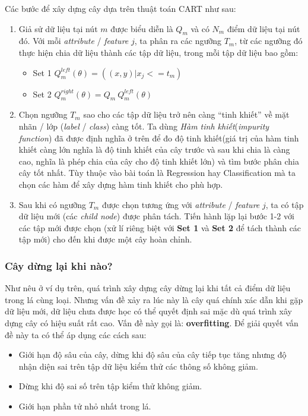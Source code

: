 \documentclass[../main-report.tex]{subfiles}
\begin{document}
Các bước để xây dựng cây dựa trên thuật toán CART như sau:

\begin{enumerate}
\item Giả sử dữ liệu tại nút $m$ được biểu diễn là $Q_{m}$ và có $N_{m}$ điểm dữ liệu tại nút đó. Với mỗi \emph{attribute} / \emph{feature} $j$, ta phân ra các ngưỡng $T_m$, từ các ngưỡng đó thực hiện chia dữ liệu thành các tập dữ liệu, trong mỗi tập dữ liệu bao gồm:

\begin{itemize}
\item Set 1 $Q^{left}_{m}(\theta) = ((x, y)|x_{j} <= t_{m})$
\item Set 2 $Q^{right}_{m}(\theta) = Q_{m} \ Q_{m}^{left}(\theta)$
\end{itemize}

\item Chọn ngưỡng $T_m$ sao cho các tập dữ liệu trở nên càng ``tinh khiết'' về mặt nhãn / lớp (\emph{label} / \emph{class}) càng tốt. Ta dùng \textit{Hàm tinh khiết}(\textit{impurity function}) đã được định nghĩa ở trên để đo độ tinh khiết(giá trị của hàm tinh khiết càng lớn nghĩa là độ tinh khiết của cây trước và sau khi chia là càng cao, nghĩa là phép chia của cây cho độ tinh khiết lớn)
 và tìm bước phân chia cây tốt nhất. Tùy thuộc vào bài toán là Regression hay Classification mà ta chọn các hàm để xây dựng hàm tinh khiết cho phù hợp.

\item Sau khi có ngưỡng $T_m$ được chọn tương ứng với \emph{attribute} / \emph{feature} $j$, ta có tập dữ liệu mới (các \emph{child node}) được phân tách. Tiến hành lặp lại bước 1-2 với các tập mới được chọn (xử lí riêng biệt với \textbf{Set 1} và \textbf{Set 2} để tách thành các tập mới) cho đến khi được một cây hoàn chỉnh.
\end{enumerate}

\subsubsection*{Cây dừng lại khi nào?}
\label{sec:stop_trees}
Như nêu ở ví dụ trên, quá trình xây dựng cây dừng lại khi tất cả điểm dữ liệu trong lá cùng loại. Nhưng vấn đề xảy ra lúc này là cây quá chính xác dẫn khi gặp dữ liệu mới, dữ liệu chưa  được học có thể quyết định sai mặc dù quá trình xây dựng cây có hiệu suất rất cao. Vấn đề này gọi là: \textbf{overfitting}. Để giải quyết vấn đề này ta có thể áp dụng các cách sau:

\begin{itemize}
\item Giới hạn độ sâu của cây, dừng khi độ sâu của cây tiếp tục tăng nhưng độ nhận diện sai trên tập dữ liệu kiểm thử các thông số không giảm. 

\item Dừng khi độ sai số trên tập kiểm thử không giảm.

\item Giới hạn phần tử nhỏ nhất trong lá. 
\end{itemize}
\end{document}
